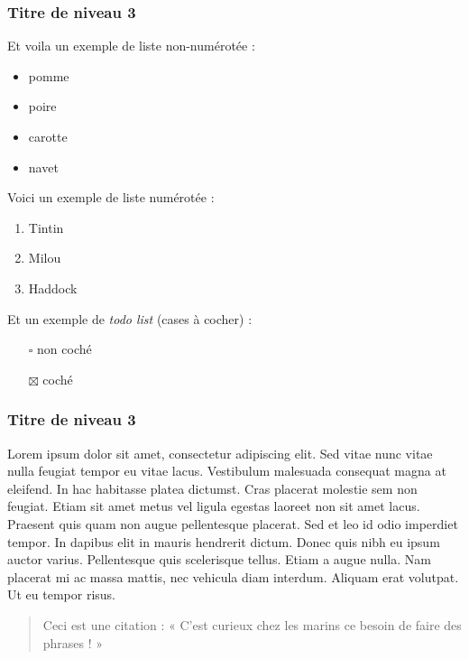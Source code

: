 \documentclass[
  10pt,
]{book}
\providecommand{\tightlist}{%
  \setlength{\itemsep}{0pt}\setlength{\parskip}{0pt}}
\begin{document}
\hypertarget{titre-de-niveau-3-1}{%
\subsubsection{Titre de niveau 3}\label{titre-de-niveau-3-1}}

Et voila un exemple de liste non-numérotée :

\begin{itemize}
\tightlist
\item
  pomme
\item
  poire
\item
  carotte
\item
  navet
\end{itemize}

Voici un exemple de liste numérotée :

\begin{enumerate}
\def\labelenumi{\arabic{enumi}.}
\tightlist
\item
  Tintin
\item
  Milou
\item
  Haddock
\end{enumerate}

Et un exemple de \emph{todo list} (cases à cocher) :

\begin{itemize}
\tightlist
\item[$\square$]
  non coché
\item[$\boxtimes$]
  coché
\end{itemize}

\hypertarget{titre-de-niveau-3-2}{%
\subsubsection{Titre de niveau 3}\label{titre-de-niveau-3-2}}

Lorem ipsum dolor sit amet, consectetur adipiscing elit. Sed vitae nunc
vitae nulla feugiat tempor eu vitae lacus. Vestibulum malesuada
consequat magna at eleifend. In hac habitasse platea dictumst. Cras
placerat molestie sem non feugiat. Etiam sit amet metus vel ligula
egestas laoreet non sit amet lacus. Praesent quis quam non augue
pellentesque placerat. Sed et leo id odio imperdiet tempor. In dapibus
elit in mauris hendrerit dictum. Donec quis nibh eu ipsum auctor varius.
Pellentesque quis scelerisque tellus. Etiam a augue nulla. Nam placerat
mi ac massa mattis, nec vehicula diam interdum. Aliquam erat volutpat.
Ut eu tempor risus.

\begin{quote}
Ceci est une citation : « C'est curieux chez les marins ce besoin de
faire des phrases ! »
\end{quote}
\end{document}

